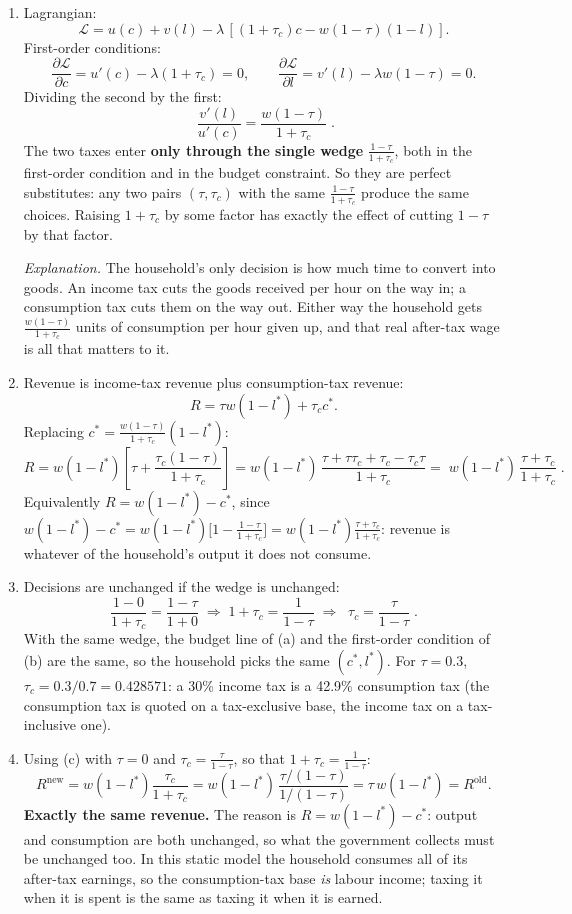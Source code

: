 \documentclass[12pt, letterpaper]{article}
\newcommand{\pd}[2]{\dfrac{\partial #1}{\partial #2}}
\begin{document}
\begin{tcolorbox}[oddbox,title={Problem 7.3 \quad Consumption Taxes and Labor Supply}]
\begin{enumerate}
\item Lagrangian:
\[
\mathcal L=u(c)+v(l)-\lambda\,[(1+\tau_c)c-w(1-\tau)(1-l)].
\]
First-order conditions:
\[
\pd{\mathcal L}{c}=u'(c)-\lambda(1+\tau_c)=0,\qquad
\pd{\mathcal L}{l}=v'(l)-\lambda w(1-\tau)=0.
\]
Dividing the second by the first:
\[
\boxed{\;\frac{v'(l)}{u'(c)}=\frac{w(1-\tau)}{1+\tau_c}\;}.
\]
The two taxes enter \textbf{only through the single wedge} $\frac{1-\tau}{1+\tau_c}$, both in
the first-order condition and in the budget constraint. So they are perfect substitutes: any
two pairs $(\tau,\tau_c)$ with the same $\frac{1-\tau}{1+\tau_c}$ produce the same choices.
Raising $1+\tau_c$ by some factor has exactly the effect of cutting $1-\tau$ by that factor.

\emph{Explanation.} The household's only decision is how much time to convert into goods. An
income tax cuts the goods received per hour on the way in; a consumption tax cuts them on the
way out. Either way the household gets $\frac{w(1-\tau)}{1+\tau_c}$ units of consumption per
hour given up, and that real after-tax wage is all that matters to it.

\item Revenue is income-tax revenue plus consumption-tax revenue:
\[
R=\tau w(1-l^*)+\tau_c c^* .
\]
Replacing $c^*=\frac{w(1-\tau)}{1+\tau_c}(1-l^*)$:
\[
R=w(1-l^*)\left[\tau+\frac{\tau_c(1-\tau)}{1+\tau_c}\right]
=w(1-l^*)\,\frac{\tau+\tau\tau_c+\tau_c-\tau_c\tau}{1+\tau_c}
=\boxed{\;w(1-l^*)\,\frac{\tau+\tau_c}{1+\tau_c}\;}.
\]
Equivalently $R=w(1-l^*)-c^*$, since
$w(1-l^*)-c^*=w(1-l^*)\big[1-\frac{1-\tau}{1+\tau_c}\big]
=w(1-l^*)\frac{\tau+\tau_c}{1+\tau_c}$: revenue is whatever of the household's output it
does not consume.

\item Decisions are unchanged if the wedge is unchanged:
\[
\frac{1-0}{1+\tau_c}=\frac{1-\tau}{1+0}
\;\Longrightarrow\;
1+\tau_c=\frac{1}{1-\tau}
\;\Longrightarrow\;
\boxed{\;\tau_c=\frac{\tau}{1-\tau}\;}.
\]
With the same wedge, the budget line of (a) and the first-order condition of (b) are the
same, so the household picks the same $(c^*,l^*)$. For $\tau=0.3$,
$\tau_c=0.3/0.7=0.428571$: a 30\% income tax is a 42.9\% consumption tax (the consumption
tax is quoted on a tax-exclusive base, the income tax on a tax-inclusive one).

\item Using (c) with $\tau=0$ and $\tau_c=\frac{\tau}{1-\tau}$, so that
$1+\tau_c=\frac{1}{1-\tau}$:
\[
R^{\text{new}}=w(1-l^*)\frac{\tau_c}{1+\tau_c}
=w(1-l^*)\,\frac{\tau/(1-\tau)}{1/(1-\tau)}
=\tau\,w(1-l^*)=R^{\text{old}} .
\]
\textbf{Exactly the same revenue.} The reason is $R=w(1-l^*)-c^*$: output and consumption are
both unchanged, so what the government collects must be unchanged too. In this static model
the household consumes all of its after-tax earnings, so the consumption-tax base \emph{is}
labour income; taxing it when it is spent is the same as taxing it when it is earned.
\end{enumerate}


\end{tcolorbox}
\end{document}
